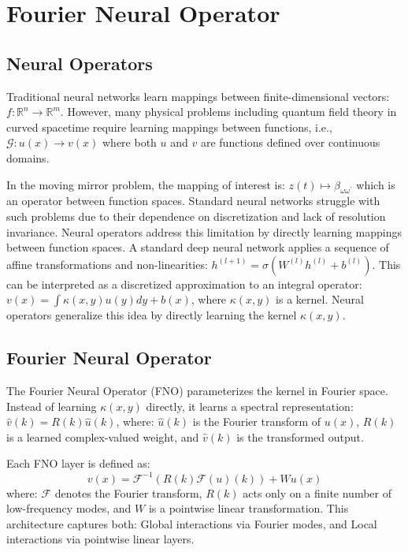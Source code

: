 \section{Fourier Neural Operator}
\subsection{Neural Operators}
Traditional neural networks learn mappings between finite-dimensional vectors: $f:\mathbb{R}^{n}\rightarrow\mathbb{R}^{m}.$ However, many physical problems including quantum field theory in curved spacetime require learning mappings between functions, i.e., $\mathcal{G}:u(x)\rightarrow v(x)$ where both $u$ and $v$ are functions defined over continuous domains. 

In the moving mirror problem, the mapping of interest is: $z(t)\mapsto\beta_{\omega\omega^{\prime}}$ which is an operator between function spaces. Standard neural networks struggle with such problems due to their dependence on discretization and lack of resolution invariance. Neural operators address this limitation by directly learning mappings between function spaces. A standard deep neural network applies a sequence of affine transformations and non-linearities: $h^{(l+1)}=\sigma(W^{(l)}h^{(l)}+b^{(l)})$. This can be interpreted as a discretized approximation to an integral operator: $v(x)=\int\kappa(x,y)u(y)dy+b(x)$, where $\kappa(x,y)$ is a kernel. Neural operators generalize this idea by directly learning the kernel $\kappa(x,y)$. 

\subsection{Fourier Neural Operator}
The Fourier Neural Operator (FNO) parameterizes the kernel in Fourier space. Instead of learning $\kappa(x,y)$ directly, it learns a spectral representation: $\hat{v}(k)=R(k)\hat{u}(k)$, where: $\hat{u}(k)$ is the Fourier transform of $u(x)$, $R(k)$ is a learned complex-valued weight, and $\hat{v}(k)$ is the transformed output. 

Each FNO layer is defined as: 
\begin{equation}
v(x)=\mathcal{F}^{-1}(R(k)\mathcal{F}(u)(k))+Wu(x)
\end{equation}
where: $\mathcal{F}$ denotes the Fourier transform, $R(k)$ acts only on a finite number of low-frequency modes, and $W$ is a pointwise linear transformation. This architecture captures both: Global interactions via Fourier modes, and Local interactions via pointwise linear layers. 

